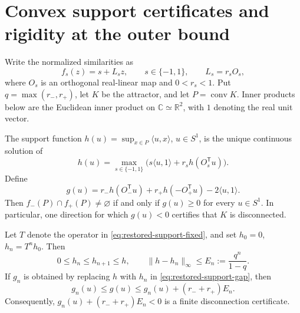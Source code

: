 \section{Convex support certificates and rigidity at the outer bound}
\label{sec:restored-support}

Write the normalized similarities as
\[
 f_s(z)=s+L_s z,\qquad s\in\{-1,1\},\qquad L_s=r_sO_s,
\]
where $O_s$ is an orthogonal real-linear map and $0<r_s<1$.
Put $q=\max(r_-,r_+)$, let $K$ be the attractor, and let
$P=\operatorname{conv}K$. Inner products below are the Euclidean inner
product on $\mathbb C\simeq\mathbb R^2$, with $1$ denoting the real unit
vector.

\begin{theorem}
\label{thm:restored-support}
The support function $h(u)=\sup_{x\in P}\langle u,x\rangle$, $u\in S^1$,
is the unique continuous solution of
\begin{equation}\label{eq:restored-support-fixed}
 h(u)=\max_{s\in\{-1,1\}}
 \bigl(s\langle u,1\rangle+r_s h(O_s^{\mathsf T}u)\bigr).
\end{equation}
Define
\begin{equation}\label{eq:restored-support-gap}
 g(u)=r_-h(O_-^{\mathsf T}u)+r_+h(-O_+^{\mathsf T}u)
       -2\langle u,1\rangle.
\end{equation}
Then $f_-(P)\cap f_+(P)\ne\varnothing$ if and only if
$g(u)\ge0$ for every $u\in S^1$. In particular, one direction for which
$g(u)<0$ certifies that $K$ is disconnected.

Let $T$ denote the operator in \eqref{eq:restored-support-fixed}, and set
$h_0=0$, $h_n=T^nh_0$. Then
\begin{equation}\label{eq:restored-support-error}
 0\le h_n\le h_{n+1}\le h,\qquad
 \|h-h_n\|_\infty\le E_n:=\frac{q^n}{1-q}.
\end{equation}
If $g_n$ is obtained by replacing $h$ with $h_n$ in
\eqref{eq:restored-support-gap}, then
\begin{equation}\label{eq:restored-support-gap-error}
 g_n(u)\le g(u)\le g_n(u)+(r_-+r_+)E_n.
\end{equation}
Consequently, $g_n(u)+(r_-+r_+)E_n<0$ is a finite disconnection
certificate.
\end{theorem}

